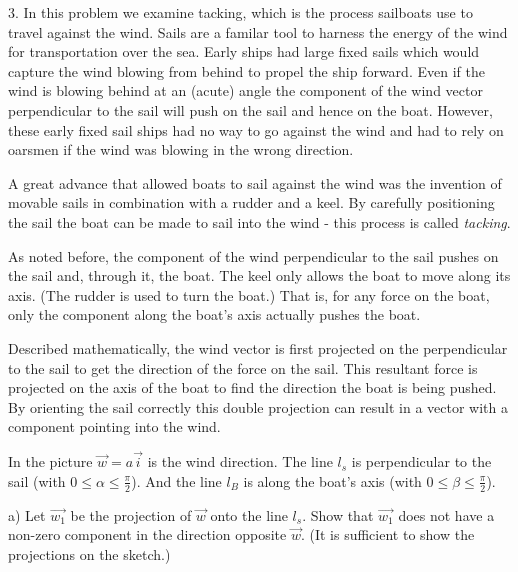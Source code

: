 \documentclass{article}
\begin{document}
3. In this problem we examine tacking, which is the process sailboats use to
travel against the wind. Sails are a familar tool to harness the energy of the
wind for transportation over the sea. Early ships had large fixed sails which
would capture the wind blowing from behind to propel the ship forward. Even if
the wind is blowing behind at an (acute) angle the component of the wind vector
perpendicular to the sail will push on the sail and hence on the boat. However,
these early fixed sail ships had no way to go against the wind and had to rely
on oarsmen if the wind was blowing in the wrong direction.

A great advance that allowed boats to sail against the wind was the invention
of movable sails in combination with a rudder and a keel. By carefully
positioning the sail the boat can be made to sail into the wind - this process
is called \emph{tacking}.

As noted before, the component of the wind perpendicular to the sail pushes on
the sail and, through it, the boat. The keel only allows the boat to move along
its axis. (The rudder is used to turn the boat.) That is, for any force on the
boat, only the component along the boat's axis actually pushes the boat.

Described mathematically, the wind vector is first projected on the
perpendicular to the sail to get the direction of the force on the sail. This
resultant force is projected on the axis of the boat to find the direction the
boat is being pushed. By orienting the sail correctly this double projection
can result in a vector with a component pointing into the wind.


In the picture $\vec{w} = a \vec{i}$ is the wind direction. The line $l_s$ is 
perpendicular to the sail (with $0 \leq \alpha \leq \frac{\pi}{2}$). And the 
line $l_B$ is along the boat's axis (with $0 \leq \beta \leq \frac{\pi}{2}$).

a) Let $\vec{w_1}$ be the projection of $\vec{w}$ onto the line $l_s$. Show that 
$\vec{w_1}$ does not have a non-zero component in the direction opposite 
$\vec{w}$. (It is sufficient to show the projections on the sketch.)
\end{document}
